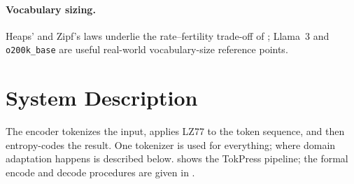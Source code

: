 \documentclass[10pt,twocolumn]{article}
\theoremstyle{plain}
\theoremstyle{definition}
\begin{document}
\paragraph{Vocabulary sizing.} Heaps' \cite{heaps1978} and Zipf's \cite{zipf1949}
laws underlie the rate--fertility trade-off of ; Llama~3
\cite{llama3} and \texttt{o200k\_base} \cite{tiktoken2024} are useful real-world
vocabulary-size reference points.

\section{System Description}\label{sec:system}

The encoder tokenizes the input, applies LZ77 to the token sequence, and then
entropy-codes the result. One tokenizer is used for everything; where domain
adaptation happens is described below.  shows the TokPress
pipeline; the formal encode and decode procedures are given in
.
\end{document}

